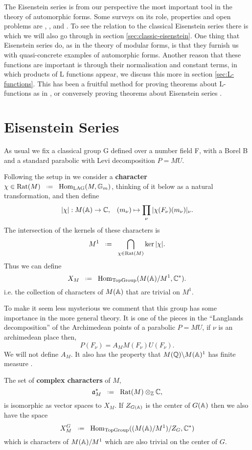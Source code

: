 The Eisenstein series is from our perspective the most important tool in the theory of automorphic forms. Some surveys on its role, properties and open problems are \cite{lapidPerspectivesEisensteinSeries2022}, \cite{arthurEisensteinSeriesTrace1979}, \cite{kimEISENSTEINSERIESTHEIR} and \cite{jiangResiduesEisensteinSeries2008a}. To see the relation to the classical Eisenstein series there is \cite{garrettTransitionEisensteinSeries2016} which we will also go through in section \ref{sec:classic-eisenstein}. One thing that Eisenstein series do, as in the theory of modular forms, is that they furnish us with quasi-concrete examples of automorphic forms. Another reason that these functions are important is through their normalisation and constant terms, in which products of L functions appear, we discuss this more in section \ref{sec:L-functions}. This has been a fruitful method for proving theorems about L-functions as in \cite{shahidiEisensteinSeriesAutomorphic2010}\cite{pollackRANKINSELBERGMETHODUSERS}\cite{arthurEisensteinSeriesTrace1979}, or conversely proving theorems about Eisenstein series \cite{jiangPolesCertainResidual2013}.

\section{Eisenstein Series}\label{sec:eisenstein-series}
As usual we fix a classical group G defined over a number field F, with a Borel B and a standard parabolic with Levi decomposition \(P = MU\). 

Following the setup in \cite[I.1.4]{moeglinSpectralDecompositionEisenstein1995} we consider a \textbf{character} \(\chi\in \mathrm{Rat}(M) \defeq \Hom_{\mathrm{LAG}}(M, \mathbb{G}_m)\), thinking of it below as a natural transformation, and then define 
\[|\chi|: M(\A)\to \C , \;\;\; (m_\nu)\mapsto \prod_\nu|\chi(F_\nu)(m_\nu)|_\nu.\]
The intersection of the kernels of these characters is 
\[M^1 \defeq \bigcap_{\chi\in \mathrm{Rat}(M)}\ker |\chi|.\]
Thus we can define
\[X_M \defeq \Hom_{\textrm{TopGroup}}(M(\A)/M^1, \C^*) .\]
i.e. the collection of characters of \(M(\A)\) that are trivial on \(M^1\).
\begin{remark}
    To make it seem less mysterious we comment that this group has some importance in the more general theory. It is one of the pieces in the ``Langlands decomposition'' of the Archimedean points of a parabolic \(P = MU\), if \(\nu\) is an archimedean place then,
    \[P(F_\nu) = A_M M(F_\nu)U(F_\nu).\]
    We will not define \(A_M\).
    It also has the property that \(M(\Q)\backslash M(\A)^1\) has finite measure \cite[4.9]{getzIntroductionAutomorphicRepresentations2024}.
\end{remark}
The set of \textbf{complex characters} of \(M\),
\[\mathfrak{a}_M^* \defeq \mathrm{Rat}(M)\tensor_\Z \C,\]
is isomorphic as \C vector spaces to \(X_M\). If \(Z_{G(\A)}\) is the center of \(G(\A)\) then we also have the space 
\[X_M^G \defeq \Hom_{\textrm{TopGroup}}((M(\A)/M^1)/Z_G, \C^*)\]
which is characters of \(M(\A)/M^1\) which are also trivial on the center of \(G\).

